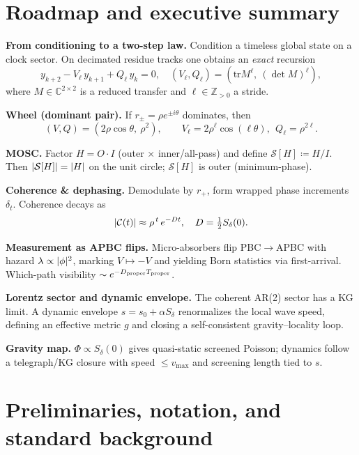 \documentclass[12pt]{article}
\theoremstyle{definition}
\newcommand{\C}{\mathbb{C}}
\newcommand{\Z}{\mathbb{Z}}
\newcommand{\tr}{\mathrm{tr}}
\newcommand{\defeq}{\coloneqq}
\DeclarePairedDelimiter{\abs}{\lvert}{\rvert}
\begin{document}
\section{Roadmap and executive summary}
\begin{summarybox}
\textbf{From conditioning to a two-step law.} Condition a timeless global state on a clock sector. On decimated residue tracks one obtains an \emph{exact} recursion
\begin{equation}
y_{k+2}-V_\ell\,y_{k+1}+Q_\ell\,y_k=0,\quad (V_\ell,Q_\ell)=(\tr M^\ell,\ (\det M)^\ell),
\label{eq:two-step}
\end{equation}
where $M\in\C^{2\times2}$ is a reduced transfer and $\ell\in\Z_{>0}$ a stride.

\textbf{Wheel (dominant pair).} If $r_\pm=\rho e^{\pm i\theta}$ dominates, then
\begin{equation}
(V,Q)=(2\rho\cos\theta,\ \rho^2),\qquad V_\ell=2\rho^\ell\cos(\ell\theta),\ \ Q_\ell=\rho^{2\ell}.
\label{eq:wheel}
\end{equation}

\textbf{MOSC.} Factor $H=O\cdot I$ (outer $\times$ inner/all-pass) and define $\mathcal{S}[H]\defeq H/I$. Then $\abs{\mathcal{S}[H]}=\abs{H}$ on the unit circle; $\mathcal{S}[H]$ is outer (minimum-phase).

\textbf{Coherence \& dephasing.} Demodulate by $r_+$, form wrapped phase increments $\delta_t$. Coherence decays as
\begin{equation}
\abs{\mathcal{C}(t)}\approx \rho^{\,t}\,e^{-Dt},\quad D=\tfrac12 S_\delta(0).
\label{eq:coherence}
\end{equation}

\textbf{Measurement as APBC flips.} Micro-absorbers flip PBC$\to$APBC with hazard $\lambda\propto\abs{\phi}^2$, marking $V\mapsto -V$ and yielding Born statistics via first-arrival. Which-path visibility $\sim e^{-D_{\rm proper}T_{\rm proper}}$.

\textbf{Lorentz sector and dynamic envelope.} The coherent AR(2) sector has a KG limit. A dynamic envelope $s=s_0+\alpha S_\delta$ renormalizes the local wave speed, defining an effective metric $g$ and closing a self-consistent gravity--locality loop.

\textbf{Gravity map.} $\Phi\propto S_\delta(0)$ gives quasi-static screened Poisson; dynamics follow a telegraph/KG closure with speed $\le v_{\max}$ and screening length tied to $s$.
\end{summarybox}

\section{Preliminaries, notation, and standard background}
\end{document}
